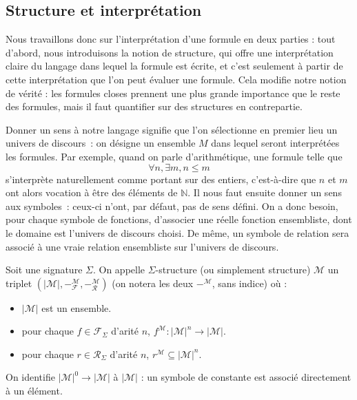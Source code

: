 \subsection{Structure et interprétation}

Nous travaillons donc sur l'interprétation d'une formule en deux parties : tout
d'abord, nous introduisons la notion de structure, qui offre une interprétation
claire du langage dans lequel la formule est écrite, et c'est seulement à partir
de cette interprétation que l'on peut évaluer une formule. Cela modifie notre
notion de vérité : les formules closes prennent une plus grande importance que
le reste des formules, mais il faut quantifier sur des structures en
contrepartie.

Donner un sens à notre langage signifie que l'on sélectionne en premier lieu un
univers de discours~: on désigne un ensemble $M$ dans lequel seront interprétées
les formules. Par exemple, quand on parle d'arithmétique, une formule telle que
\[\forall n,\exists m, n \leq m\]
s'interprète naturellement comme portant sur des entiers, c'est-à-dire que $n$
et $m$ ont alors vocation à être des éléments de $\mathbb N$. Il nous faut
ensuite donner un sens aux symboles~: ceux-ci n'ont, par défaut, pas de sens
défini. On a donc besoin, pour chaque symbole de fonctions, d'associer une
réelle fonction ensembliste, dont le domaine est l'univers de discours choisi.
De même, un symbole de relation sera associé à une vraie relation ensembliste
sur l'univers de discours.

\begin{definition}[Structure]
  Soit une signature $\Sigma$. On appelle $\Sigma$-structure (ou simplement
  structure) $\mathcal M$ un triplet
  $(|\mathcal M|,-^{\mathcal M}_\mathcal F,-^{\mathcal M}_\mathcal R)$
  (on notera les deux $-^{\mathcal M}$, sans indice) où :
  \begin{itemize}
  \item $|\mathcal M|$ est un ensemble.
  \item pour chaque $f\in \mathcal F_\Sigma$ d'arité $n$,
    $f^{\mathcal M} : |\mathcal M|^n \to |\mathcal M|$.
  \item pour chaque $r\in\mathcal R_\Sigma$ d'arité $n$,
    $r^{\mathcal M} \subseteq |\mathcal M|^n$.
  \end{itemize}

  On identifie $|\mathcal M|^0 \to |\mathcal M|$ à $|\mathcal M|$ : un symbole
  de constante est associé directement à un élément.
\end{definition}

